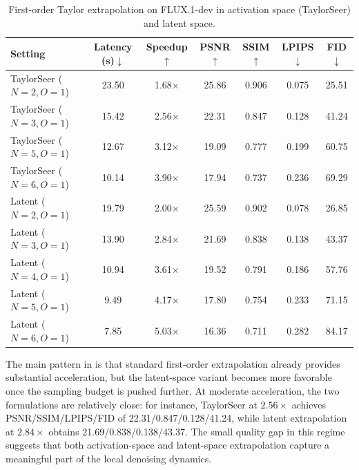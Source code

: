 \begin{table}[H]
\centering
\begingroup
\setlength{\tabcolsep}{0.32em}
\renewcommand{\arraystretch}{1.06}
\begin{tabular}{LCCCCCC}
\toprule
\textbf{Setting}
    & \textbf{Latency (s)$\downarrow$}
    & \textbf{Speedup$\uparrow$}
    & \textbf{PSNR$\uparrow$}
    & \textbf{SSIM$\uparrow$}
    & \textbf{LPIPS$\downarrow$}
    & \textbf{FID$\downarrow$} \\
\midrule
TaylorSeer ($N{=}2,O{=}1$)
    & 23.50
    & 1.68$\times$
    & 25.86
    & 0.906
    & 0.075
    & 25.51 \\
TaylorSeer ($N{=}3,O{=}1$)
    & 15.42
    & 2.56$\times$
    & 22.31
    & 0.847
    & 0.128
    & 41.24 \\
TaylorSeer ($N{=}5,O{=}1$)
    & 12.67
    & 3.12$\times$
    & 19.09
    & 0.777
    & 0.199
    & 60.75 \\
TaylorSeer ($N{=}6,O{=}1$)
    & 10.14
    & 3.90$\times$
    & 17.94
    & 0.737
    & 0.236
    & 69.29 \\
\midrule
Latent ($N{=}2,O{=}1$)
    & 19.79
    & 2.00$\times$
    & 25.59
    & 0.902
    & 0.078
    & 26.85 \\
Latent ($N{=}3,O{=}1$)
    & 13.90
    & 2.84$\times$
    & 21.69
    & 0.838
    & 0.138
    & 43.37 \\
Latent ($N{=}4,O{=}1$)
    & 10.94
    & 3.61$\times$
    & 19.52
    & 0.791
    & 0.186
    & 57.76 \\
Latent ($N{=}5,O{=}1$)
    & 9.49
    & 4.17$\times$
    & 17.80
    & 0.754
    & 0.233
    & 71.15 \\
Latent ($N{=}6,O{=}1$)
    & 7.85
    & 5.03$\times$
    & 16.36
    & 0.711
    & 0.282
    & 84.17 \\
\bottomrule
\end{tabular}
\endgroup
\caption{First-order Taylor extrapolation on FLUX.1-dev in activation space (TaylorSeer) and latent space.}
\label{tab:app:flux-taylor-latent}
\end{table}

The main pattern in 
is that standard first-order extrapolation already provides substantial acceleration,
but the latent-space variant becomes more favorable
once the sampling budget is pushed further.
At moderate acceleration,
the two formulations are relatively close:
for instance,
TaylorSeer at \(2.56\times\) achieves
PSNR/SSIM/LPIPS/FID of 22.31/0.847/0.128/41.24,
while latent extrapolation at \(2.84\times\)
obtains 21.69/0.838/0.138/43.37.
The small quality gap in this regime suggests that
both activation-space and latent-space extrapolation
capture a meaningful part of the local denoising dynamics.

